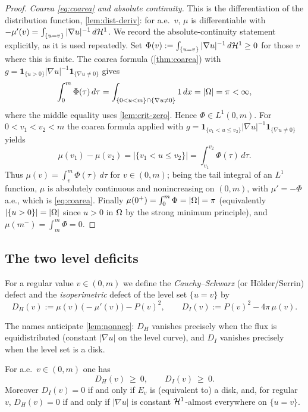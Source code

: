 \begin{proof}
\emph{Coarea \eqref{eq:coarea} and absolute continuity.} This is the
differentiation of the distribution function, \cref{lem:dist-deriv}: for
a.e.\ $v$, $\mu$ is differentiable with $-\mu'(v)=\int_{\{u=v\}}|\nabla
u|^{-1}\,d\mathcal{H}^1$. We record the absolute-continuity statement explicitly, as
it is used repeatedly. Set $\Phi(v):=\int_{\{u=v\}}|\nabla u|^{-1}\,d\mathcal{H}^1\ge0$
for those $v$ where this is finite. The coarea formula (\cref{thm:coarea})
with $g=\mathbf 1_{\{u>0\}}|\nabla u|^{-1}\mathbf 1_{\{\nabla u\ne0\}}$ gives
\[
   \int_0^m\Phi(\tau)\,d\tau
   =\int_{\{0<u<m\}\cap\{\nabla u\ne0\}}1\,dx
   =|\Omega|=\pi<\infty ,
\]
where the middle equality uses \cref{lem:crit-zero}. Hence $\Phi\in
L^1(0,m)$. For $0<v_1<v_2<m$ the coarea formula applied with
$g=\mathbf 1_{\{v_1<u\le v_2\}}|\nabla u|^{-1}\mathbf 1_{\{\nabla u\ne0\}}$
yields
\[
   \mu(v_1)-\mu(v_2)=|\{v_1<u\le v_2\}|=\int_{v_1}^{v_2}\Phi(\tau)\,d\tau .
\]
Thus $\mu(v)=\int_v^m\Phi(\tau)\,d\tau$ for $v\in(0,m)$; being the tail
integral of an $L^1$ function, $\mu$ is absolutely continuous and
nonincreasing on $(0,m)$, with $\mu'=-\Phi$ a.e., which is \eqref{eq:coarea}.
Finally $\mu(0^+)=\int_0^m\Phi=|\Omega|=\pi$ (equivalently $|\{u>0\}|=|\Omega|$
since $u>0$ in $\Omega$ by the strong minimum principle), and
$\mu(m^-)=\int_m^m\Phi=0$.
\end{proof}

\subsection{The two level deficits}

\begin{definition}\label{def:deficits}
For a regular value $v\in(0,m)$ we define the \emph{Cauchy--Schwarz} (or
H\"older/Serrin) defect and the \emph{isoperimetric} defect of the level set
$\{u=v\}$ by
\[
   D_H(v):=\mu(v)\,\bigl(-\mu'(v)\bigr)-P(v)^2 ,
   \qquad
   D_I(v):=P(v)^2-4\pi\,\mu(v).
\]
\end{definition}

The names anticipate \cref{lem:nonneg}: $D_H$ vanishes precisely when the
flux is equidistributed (constant $|\nabla u|$ on the level curve), and $D_I$
vanishes precisely when the level set is a disk.

\begin{lemma}\label{lem:nonneg}
For a.e.\ $v\in(0,m)$ one has
\[
   D_H(v)\ \ge\ 0,\qquad D_I(v)\ \ge\ 0 .
\]
Moreover $D_I(v)=0$ if and only if $E_v$ is (equivalent to) a disk, and, for
regular $v$, $D_H(v)=0$ if and only if $|\nabla u|$ is constant
$\mathcal{H}^1$-almost everywhere on $\{u=v\}$.
\end{lemma}

